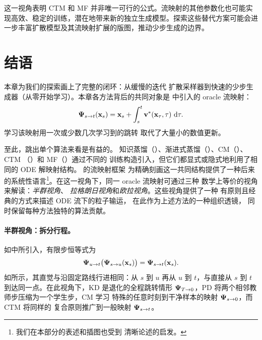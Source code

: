 这一视角表明 CTM 和 MF 并非唯一可行的公式。流映射的其他参数化也可能实现高效、稳定的训练，潜在地带来新的独立生成模型。探索这些替代方案可能会进一步丰富扩散模型及其流映射扩展的版图，推动少步生成的边界。

\newpage

\section{结语}\label{sec:ch11_cr}

本章为我们的探索画上了完整的闭环：从缓慢的迭代
扩散采样器到快速的少步生成器（从零开始学习）。本章各方法背后的共同对象是
中引入的 oracle 流映射：
\[
{\bm{\Psi}}_{s\to t}({\mathbf{x}}_s)
=
{\mathbf{x}}_s+\int_s^t {\mathbf{v}}^*({\mathbf{x}}_\tau,\tau)\,\mathop{}\!\mathrm{d} \tau.
\]
学习该映射用一次或少数几次学习到的跳转
取代了大量小的数值更新。

至此，跳出单个算法来看是有益的。
知识蒸馏（）、渐进式蒸馏（）、CM（）、CTM
（）和 MF（）通过不同的
训练构造引入，但它们都显式或隐式地利用了相同的
ODE 解映射结构。\citet{boffi2024flow} 的流映射框架
为精确刻画这一共同结构提供了一种后来的系统性语言\footnote{我们在本部分的表述和插图也受到
\citet{dieleman2026flowmaps} 清晰论述的启发。}。在这一视角下，同一 oracle 流映射可通过三种
数学上等价的视角来解读：\emph{半群视角}、
\emph{拉格朗日视角}和\emph{欧拉视角}。这些视角提供了一种
有原则且经典的方式来描述 ODE 流下的粒子输运，
在此作为上述方法的一种组织透镜，
同时保留每种方法独特的算法贡献。

\paragraph{半群视角：拆分行程。}
如中所引入，有限步恒等式为
\[
{\bm{\Psi}}_{u\to t}\big({\bm{\Psi}}_{s\to u}({\mathbf{x}}_s)\big)
=
{\bm{\Psi}}_{s\to t}({\mathbf{x}}_s).
\]
如所示，其直觉与沿固定路线行进相同：从 $s$ 到
$u$ 再从 $u$ 到 $t$，与直接从
$s$ 到 $t$ 到达同一点。在此视角下，KD 是退化的全程跳转情形 ${\bm{\Psi}}_{T\to0}$，PD
将两个相邻教师步压缩为一个学生步，CM 学习
特殊的任意时刻到干净样本的映射 ${\bm{\Psi}}_{s\to0}$，而 CTM 将同样的
复合原则推广到一般映射 ${\bm{\Psi}}_{s\to t}$。

